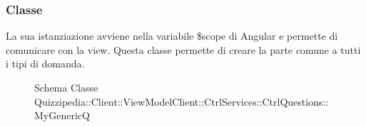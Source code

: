 \subsubsection{Classe }
La sua istanziazione avviene nella variabile \$scope di Angular e permette di comunicare con la view. Questa classe permette di creare la parte comune a tutti i tipi di domanda.
\begin{figure}[H]
\centering
\noindent{}
\caption[Schema Classe MyGenericQ]{Schema Classe Quizzipedia::Client::ViewModelClient::CtrlServices::CtrlQuestions::MyGenericQ}
\end{figure}

